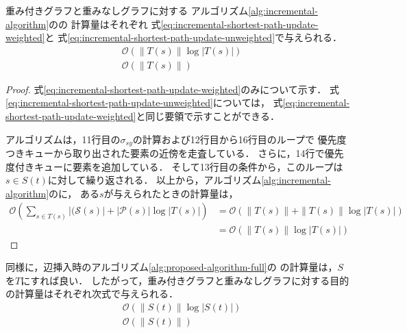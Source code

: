 \begin{theorem}
  \label{thm:incremental-shortest-path-update}
  重み付きグラフと重みなしグラフに対する
  アルゴリズム\ref{alg:incremental-algorithm}のの
  計算量はそれぞれ
  式\eqref{eq:incremental-shortest-path-update-weighted}と
  式\eqref{eq:incremental-shortest-path-update-unweighted}で与えられる．
  \begin{align}
    &\mathcal{O}\left(\|T(s)\|\log|T(s)|\right)
    \label{eq:incremental-shortest-path-update-weighted} \\
    &\mathcal{O}\left(\|T(s)\|\right)
    \label{eq:incremental-shortest-path-update-unweighted}
  \end{align}
\end{theorem}
\begin{proof}
  式\eqref{eq:incremental-shortest-path-update-weighted}のみについて示す．
  式\eqref{eq:incremental-shortest-path-update-unweighted}については，
  式\eqref{eq:incremental-shortest-path-update-weighted}と同じ要領で示すことができる．

  アルゴリズムは，11行目の$\sigma_{sy}$の計算および12行目から16行目のループで
  優先度つきキューから取り出された要素の近傍を走査している．
  さらに，14行で優先度付きキューに要素を追加している．
  そして13行目の条件から，このループは$s\in S(t)$に対して繰り返される．
  以上から，アルゴリズム\ref{alg:incremental-algorithm}のに，
  ある$s$が与えられたときの計算量は，
  \begin{equation*}
    \begin{aligned}
      \mathcal{O}\left(\sum_{s\in T(s)}|(\mathcal{S}(s)|+|\mathcal{P}(s)|\log|T(s)|\right)
      &=\mathcal{O}(\|T(s)\|+\|T(s)\|\log|T(s)|) \\
      &=\mathcal{O}(\|T(s)\|\log|T(s)|)
    \end{aligned}
  \end{equation*}
\end{proof}

同様に，辺挿入時のアルゴリズム\ref{alg:proposed-algorithm-full}の
の計算量は，$S$を$T$にすれば良い．
したがって，重み付きグラフと重みなしグラフに対する目的の計算量はそれぞれ次式で与えられる．
\begin{equation*}
  \begin{aligned}
    &\mathcal{O}\left(\|S(t)\|\log|S(t)|\right) \\
    &\mathcal{O}\left(\|S(t)\|\right)
  \end{aligned}
\end{equation*}

